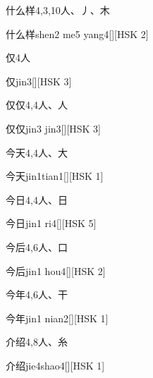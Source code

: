 \begin{entry}{什么样}{4,3,10}{⼈、⼃、⽊}
  \begin{phonetics}{什么样}{shen2 me5 yang4}[][HSK 2]
  \end{phonetics}
\end{entry}

\begin{entry}{仅}{4}{⼈}
  \begin{phonetics}{仅}{jin3}[][HSK 3]
  \end{phonetics}
\end{entry}

\begin{entry}{仅仅}{4,4}{⼈、⼈}
  \begin{phonetics}{仅仅}{jin3 jin3}[][HSK 3]
  \end{phonetics}
\end{entry}

\begin{entry}{今天}{4,4}{⼈、⼤}
  \begin{phonetics}{今天}{jin1tian1}[][HSK 1]
  \end{phonetics}
\end{entry}

\begin{entry}{今日}{4,4}{⼈、⽇}
  \begin{phonetics}{今日}{jin1 ri4}[][HSK 5]
  \end{phonetics}
\end{entry}

\begin{entry}{今后}{4,6}{⼈、⼝}
  \begin{phonetics}{今后}{jin1 hou4}[][HSK 2]
  \end{phonetics}
\end{entry}

\begin{entry}{今年}{4,6}{⼈、⼲}
  \begin{phonetics}{今年}{jin1 nian2}[][HSK 1]
  \end{phonetics}
\end{entry}

\begin{entry}{介绍}{4,8}{⼈、⽷}
  \begin{phonetics}{介绍}{jie4shao4}[][HSK 1]
  \end{phonetics}
\end{entry}

